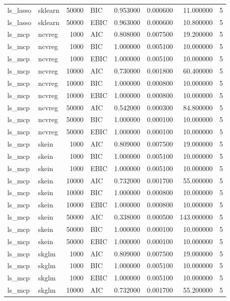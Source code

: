 \begin{table}[t]
\begin{tabular}{llrlrrrr}
ls_lasso & sklearn & 50000 & BIC & 0.953000 & 0.000600 & 11.000000 & 5 \\
ls_lasso & sklearn & 50000 & EBIC & 0.963000 & 0.000600 & 10.800000 & 5 \\
ls_mcp & ncvreg & 1000 & AIC & 0.808000 & 0.007500 & 19.200000 & 5 \\
ls_mcp & ncvreg & 1000 & BIC & 1.000000 & 0.005100 & 10.000000 & 5 \\
ls_mcp & ncvreg & 1000 & EBIC & 1.000000 & 0.005100 & 10.000000 & 5 \\
ls_mcp & ncvreg & 10000 & AIC & 0.730000 & 0.001800 & 60.400000 & 5 \\
ls_mcp & ncvreg & 10000 & BIC & 1.000000 & 0.000800 & 10.000000 & 5 \\
ls_mcp & ncvreg & 10000 & EBIC & 1.000000 & 0.000800 & 10.000000 & 5 \\
ls_mcp & ncvreg & 50000 & AIC & 0.542000 & 0.000300 & 84.800000 & 5 \\
ls_mcp & ncvreg & 50000 & BIC & 1.000000 & 0.000100 & 10.000000 & 5 \\
ls_mcp & ncvreg & 50000 & EBIC & 1.000000 & 0.000100 & 10.000000 & 5 \\
ls_mcp & skein & 1000 & AIC & 0.809000 & 0.007500 & 19.000000 & 5 \\
ls_mcp & skein & 1000 & BIC & 1.000000 & 0.005100 & 10.000000 & 5 \\
ls_mcp & skein & 1000 & EBIC & 1.000000 & 0.005100 & 10.000000 & 5 \\
ls_mcp & skein & 10000 & AIC & 0.732000 & 0.001700 & 55.000000 & 5 \\
ls_mcp & skein & 10000 & BIC & 1.000000 & 0.000800 & 10.000000 & 5 \\
ls_mcp & skein & 10000 & EBIC & 1.000000 & 0.000800 & 10.000000 & 5 \\
ls_mcp & skein & 50000 & AIC & 0.338000 & 0.000500 & 143.000000 & 5 \\
ls_mcp & skein & 50000 & BIC & 1.000000 & 0.000100 & 10.000000 & 5 \\
ls_mcp & skein & 50000 & EBIC & 1.000000 & 0.000100 & 10.000000 & 5 \\
ls_mcp & skglm & 1000 & AIC & 0.809000 & 0.007500 & 19.000000 & 5 \\
ls_mcp & skglm & 1000 & BIC & 1.000000 & 0.005100 & 10.000000 & 5 \\
ls_mcp & skglm & 1000 & EBIC & 1.000000 & 0.005100 & 10.000000 & 5 \\
ls_mcp & skglm & 10000 & AIC & 0.732000 & 0.001700 & 55.200000 & 5 \\

\end{tabular}
\end{table}
